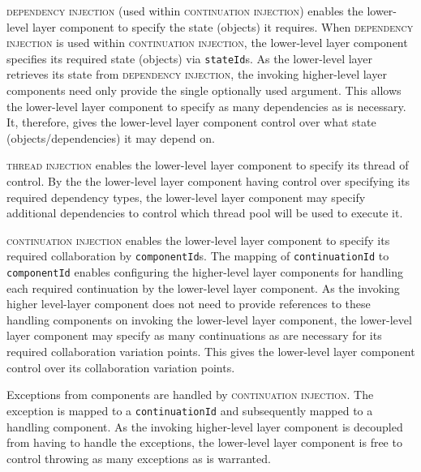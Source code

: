 \documentclass[prodmode]{style/acmlarge}
\begin{document}
\textsc{dependency injection} \cite{ioc} (used within \textsc{continuation
injection}) enables the lower-level layer component to specify the state
(objects) it requires.  When \textsc{dependency injection} is used within
\textsc{continuation injection}, the lower-level layer component specifies its
required state (objects) via \texttt{stateId}s.  As the lower-level layer
retrieves its state from \textsc{dependency injection}, the invoking
higher-level layer components need only provide the single optionally used
argument.  This allows the lower-level layer component to specify as many
dependencies as is necessary.  It, therefore, gives the lower-level layer component
control over what state (objects/dependencies) it may depend on.

\textsc{thread injection} enables the lower-level layer component to specify its
thread of control.  By the the lower-level layer component having control over
specifying its required dependency types, the lower-level layer component may
specify additional dependencies to control which thread pool will be used to
execute it.

\textsc{continuation injection} enables the lower-level layer component to
specify its required collaboration by \texttt{componentId}s.  The mapping of
\texttt{continuationId} to \texttt{componentId} enables configuring the
higher-level layer components for handling each required continuation by the
lower-level layer component.  As the invoking higher level-layer component does
not need to provide references to these handling components on invoking the
lower-level layer component, the lower-level layer component may specify as many
continuations as are necessary for its required collaboration variation points. 
This gives the lower-level layer component control over its collaboration
variation points.

Exceptions from components are handled by \textsc{continuation injection}.  The
exception is mapped to a \texttt{continuationId} and subsequently mapped to a
handling component.  As the  invoking higher-level layer component is decoupled
from having to handle the exceptions, the lower-level layer component is free to
control throwing as many exceptions as is warranted.
\end{document}
